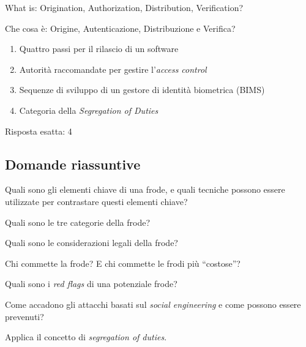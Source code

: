\begin{Exercise} [
  title={Definizioni},
  label={fr6}
 ]

 \Question What is: Origination, Authorization, Distribution, Verification?

 Che cosa è: Origine, Autenticazione, Distribuzione e Verifica?

 \begin{enumerate}
  \item Quattro passi per il rilascio di un software
  \item Autorità raccomandate per gestire l'\textit{access control}
  \item Sequenze di sviluppo di un gestore di identità biometrica (BIMS)
  \item Categoria della \textit{Segregation of Duties}
 \end{enumerate}

\end{Exercise}

\begin{Answer} [
  ref={fr6},
  number={6}
 ]

 \Question Risposta esatta: 4
\end{Answer}



\subsection{Domande riassuntive}
\label{EsFrodi3}

\begin{Exercise} [
  title={Domande riassuntive},
  label={fr7}
 ]

 \Question Quali sono gli elementi chiave di una frode, e quali tecniche
possono essere utilizzate per contrastare questi elementi chiave?

 \Question Quali sono le tre categorie della frode?

 \Question Quali sono le considerazioni legali della frode?

 \Question Chi commette la frode? E chi commette le frodi più ``costose''?

 \Question Quali sono i \textit{red flags} di una potenziale frode?

 \Question Come accadono gli attacchi basati sul \textit{social engineering} e
come possono essere prevenuti?

 \Question Applica il concetto di \textit{segregation of duties}. %

\end{Exercise}


